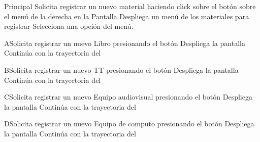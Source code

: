 \begin{UCtrayectoria}{Principal}
		\UCpaso[\UCactor] Solicita registrar un nuevo material haciendo click sobre el botón  sobre el menú de la derecha en la Pantalla 
		\UCpaso[\UCsist] Despliega un menú de los materiales para registrar
		\UCpaso[\UCactor] Selecciona una opción del menú.    
\end{UCtrayectoria}


\begin{UCtrayectoriaA}{A}{Solicita registrar un nuevo Libro presionando el botón }	
		\UCpaso[\UCsist] Despliega la pantalla  
		\UCpaso[\UCsist] Continúa con la trayectoria del 
		\end{UCtrayectoriaA}

\begin{UCtrayectoriaA}{B}{Solicita registrar un nuevo TT presionando el botón }	
		\UCpaso[\UCsist] Despliega la pantalla  
		\UCpaso[\UCsist] Continúa con la trayectoria del 
\end{UCtrayectoriaA}


\begin{UCtrayectoriaA}{C}{Solicita registrar un nuevo Equipo audiovisual presionando el botón }	
		\UCpaso[\UCsist] Despliega la pantalla  
		\UCpaso[\UCsist] Continúa con la trayectoria del 
\end{UCtrayectoriaA}


\begin{UCtrayectoriaA}{D}{Solicita registrar un nuevo Equipo de computo presionando el botón }	
		\UCpaso[\UCsist] Despliega la pantalla  
		\UCpaso[\UCsist] Continúa con la trayectoria del 
\end{UCtrayectoriaA}

